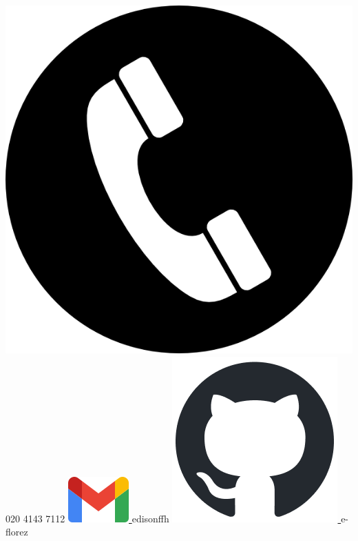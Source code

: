 \begin{center}
    \includegraphics[scale=0.3]{figs/phone.png}
    020 4143 7112
    \hspace*{5mm}
    \href{mailto:edisonffh@gmail.com}{
        \includegraphics[scale=0.25]{figs/gmail_icon.png}
    } edisonffh
    \hspace*{5mm}
    \href{https://github.com/e-florez}{
        \includegraphics[scale=0.3]{figs/github-mark.png}
    } e-florez
    \hspace*{5mm}
    \href{https://www.linkedin.com/in/edisonflorez/}{
}
\end{center}
